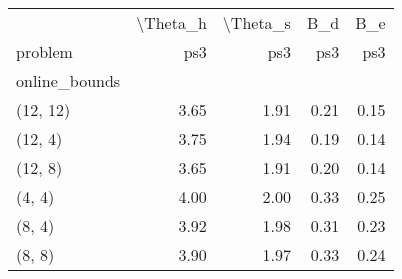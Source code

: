\begin{tabular}{lrrrr}
\toprule
{} & \textbackslash Theta\_h & \textbackslash Theta\_s &  B\_d &  B\_e \\
problem &      ps3 &      ps3 &  ps3 &  ps3 \\
online\_bounds &          &          &      &      \\
\midrule
(12, 12)      &     3.65 &     1.91 & 0.21 & 0.15 \\
(12, 4)       &     3.75 &     1.94 & 0.19 & 0.14 \\
(12, 8)       &     3.65 &     1.91 & 0.20 & 0.14 \\
(4, 4)        &     4.00 &     2.00 & 0.33 & 0.25 \\
(8, 4)        &     3.92 &     1.98 & 0.31 & 0.23 \\
(8, 8)        &     3.90 &     1.97 & 0.33 & 0.24 \\
\bottomrule
\end{tabular}
